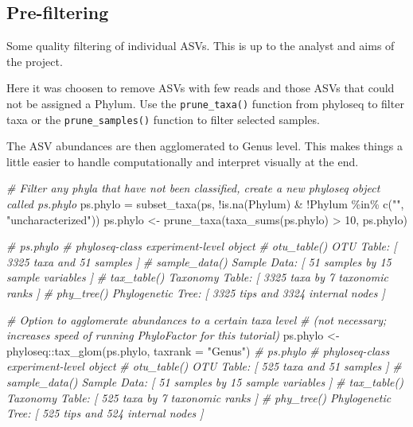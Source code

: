 \documentclass[
]{book}
\newenvironment{Shaded}{\begin{snugshade}}{\end{snugshade}}
\newcommand{\AttributeTok}[1]{\textcolor[rgb]{0.77,0.63,0.00}{#1}}
\newcommand{\CommentTok}[1]{\textcolor[rgb]{0.56,0.35,0.01}{\textit{#1}}}
\newcommand{\DecValTok}[1]{\textcolor[rgb]{0.00,0.00,0.81}{#1}}
\newcommand{\FunctionTok}[1]{\textcolor[rgb]{0.00,0.00,0.00}{#1}}
\newcommand{\NormalTok}[1]{#1}
\newcommand{\OtherTok}[1]{\textcolor[rgb]{0.56,0.35,0.01}{#1}}
\newcommand{\SpecialCharTok}[1]{\textcolor[rgb]{0.00,0.00,0.00}{#1}}
\newcommand{\StringTok}[1]{\textcolor[rgb]{0.31,0.60,0.02}{#1}}
\begin{document}
\hypertarget{pre-filtering-1}{%
\subsection{Pre-filtering}\label{pre-filtering-1}}

Some quality filtering of individual ASVs. This is up to the analyst and aims of the project.

Here it was choosen to remove ASVs with few reads and those ASVs that could not be assigned a Phylum. Use the \texttt{prune\_taxa()} function from phyloseq to filter taxa or the \texttt{prune\_samples()} function to filter selected samples.

The ASV abundances are then agglomerated to Genus level. This makes things a little easier to handle computationally and interpret visually at the end.

\begin{Shaded}
\begin{Highlighting}[]
\CommentTok{\# Filter any phyla that have not been classified, create a new phyloseq object called ps.phylo}
\NormalTok{ps.phylo }\OtherTok{=} \FunctionTok{subset\_taxa}\NormalTok{(ps, }\SpecialCharTok{!}\FunctionTok{is.na}\NormalTok{(Phylum) }\SpecialCharTok{\&} \SpecialCharTok{!}\NormalTok{Phylum }\SpecialCharTok{\%in\%} \FunctionTok{c}\NormalTok{(}\StringTok{""}\NormalTok{, }\StringTok{"uncharacterized"}\NormalTok{))}
\NormalTok{ps.phylo }\OtherTok{\textless{}{-}} \FunctionTok{prune\_taxa}\NormalTok{(}\FunctionTok{taxa\_sums}\NormalTok{(ps.phylo)  }\SpecialCharTok{\textgreater{}} \DecValTok{10}\NormalTok{, ps.phylo)}

\CommentTok{\# ps.phylo }
\CommentTok{\# phyloseq{-}class experiment{-}level object}
\CommentTok{\# otu\_table()   OTU Table:         [ 3325 taxa and 51 samples ]}
\CommentTok{\# sample\_data() Sample Data:       [ 51 samples by 15 sample variables ]}
\CommentTok{\# tax\_table()   Taxonomy Table:    [ 3325 taxa by 7 taxonomic ranks ]}
\CommentTok{\# phy\_tree()    Phylogenetic Tree: [ 3325 tips and 3324 internal nodes ]}

\CommentTok{\# Option to agglomerate abundances to a certain taxa level }
\CommentTok{\# (not necessary; increases speed of running PhyloFactor for this tutorial)}
\NormalTok{ps.phylo }\OtherTok{\textless{}{-}}\NormalTok{ phyloseq}\SpecialCharTok{::}\FunctionTok{tax\_glom}\NormalTok{(ps.phylo, }\AttributeTok{taxrank =} \StringTok{"Genus"}\NormalTok{)  }
\CommentTok{\# ps.phylo  }
\CommentTok{\# phyloseq{-}class experiment{-}level object}
\CommentTok{\# otu\_table()   OTU Table:         [ 525 taxa and 51 samples ]}
\CommentTok{\# sample\_data() Sample Data:       [ 51 samples by 15 sample variables ]}
\CommentTok{\# tax\_table()   Taxonomy Table:    [ 525 taxa by 7 taxonomic ranks ]}
\CommentTok{\# phy\_tree()    Phylogenetic Tree: [ 525 tips and 524 internal nodes ]}
\end{Highlighting}
\end{Shaded}
\end{document}

